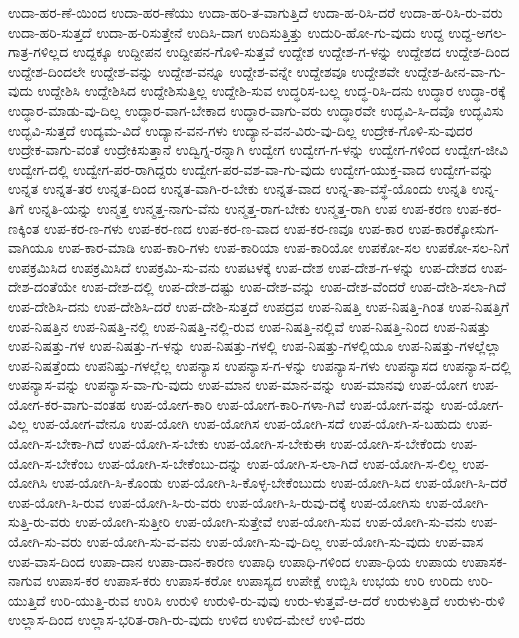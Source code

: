 {ಉದಾ-ಹರ-ಣೆ-ಯಿಂದ
ಉದಾ-ಹರ-ಣೆಯು
ಉದಾ-ಹರಿ-ತ-ವಾಗುತ್ತಿದೆ
ಉದಾ-ಹ-ರಿಸಿ-ದರೆ
ಉದಾ-ಹ-ರಿಸಿ-ರು-ವರು
ಉದಾ-ಹರಿ-ಸುತ್ತದೆ
ಉದಾ-ಹ-ರಿಸುತ್ತೇನೆ
ಉದಿಸಿ-ದಾಗ
ಉದಿಸುತ್ತಿತ್ತು
ಉದುರಿ-ಹೋ-ಗು-ವುದು
ಉದ್ದ
ಉದ್ದ-ಅಗಲ-ಗಾತ್ರ-ಗಳಿಲ್ಲದ
ಉದ್ದಕ್ಕೂ
ಉದ್ದೀಪನ
ಉದ್ದೀಪನ-ಗೊಳಿ-ಸುತ್ತವೆ
ಉದ್ದೇಶ
ಉದ್ದೇಶ-ಗ-ಳನ್ನು
ಉದ್ದೇಶದ
ಉದ್ದೇಶ-ದಿಂದ
ಉದ್ದೇಶ-ದಿಂದಲೇ
ಉದ್ದೇಶ-ವನ್ನು
ಉದ್ದೇಶ-ವನ್ನೂ
ಉದ್ದೇಶ-ವನ್ನೇ
ಉದ್ದೇಶವೂ
ಉದ್ದೇಶವೇ
ಉದ್ದೇಶ-ಹೀನ-ವಾ-ಗು-ವುದು
ಉದ್ದೇಶಿಸಿ
ಉದ್ದೇಶಿಸಿದ
ಉದ್ದೇಶಿಸುತ್ತಿಲ್ಲ
ಉದ್ದೇಶಿ-ಸುವ
ಉದ್ಧರಿಸ-ಬಲ್ಲ
ಉದ್ಧ-ರಿಸಿ-ದನು
ಉದ್ಧಾರ
ಉದ್ಧಾ-ರಕ್ಕೆ
ಉದ್ಧಾರ-ಮಾಡು-ವು-ದಿಲ್ಲ
ಉದ್ಧಾರ-ವಾಗ-ಬೇಕಾದ
ಉದ್ಧಾರ-ವಾಗು-ವರು
ಉದ್ಧಾರವೇ
ಉದ್ಭವಿ-ಸಿ-ದವೊ
ಉದ್ಭವಿಸು
ಉದ್ಭವಿ-ಸುತ್ತದೆ
ಉದ್ಯಮ-ವಿದೆ
ಉದ್ಯಾನ-ವನ-ಗಳು
ಉದ್ಯಾನ-ವನ-ವಿರು-ವು-ದಿಲ್ಲ
ಉದ್ರೇಕ-ಗೊಳಿ-ಸು-ವುದರ
ಉದ್ರೇಕ-ವಾಗು-ವಂತೆ
ಉದ್ರೇಕಿಸುತ್ತಾನೆ
ಉದ್ವಿಗ್ನ-ರನ್ನಾಗಿ
ಉದ್ವೇಗ
ಉದ್ವೇಗ-ಗ-ಳನ್ನು
ಉದ್ವೇಗ-ಗಳಿಂದ
ಉದ್ವೇಗ-ಜೀವಿ
ಉದ್ವೇಗ-ದಲ್ಲಿ
ಉದ್ವೇಗ-ಪರ-ರಾಗಿದ್ದರು
ಉದ್ವೇಗ-ಪರ-ವಶ-ವಾ-ಗು-ವುದು
ಉದ್ವೇಗ-ಯುಕ್ತ-ವಾದ
ಉದ್ವೇಗ-ವನ್ನು
ಉನ್ನತ
ಉನ್ನತ-ತರ
ಉನ್ನತ-ದಿಂದ
ಉನ್ನತ-ವಾಗಿ-ರ-ಬೇಕು
ಉನ್ನತ-ವಾದ
ಉನ್ನ-ತಾ-ವಸ್ಥೆ-ಯೊಂದು
ಉನ್ನತಿ
ಉನ್ನ-ತಿಗೆ
ಉನ್ನತಿ-ಯನ್ನು
ಉನ್ಮತ್ತ
ಉನ್ಮತ್ತ-ನಾಗು-ವೆನು
ಉನ್ಮತ್ತ-ರಾಗ-ಬೇಕು
ಉನ್ಮತ್ತ-ರಾಗಿ
ಉಪ
ಉಪ-ಕರಣ
ಉಪ-ಕರ-ಣಕ್ಕಿಂತ
ಉಪ-ಕರ-ಣ-ಗಳು
ಉಪ-ಕರ-ಣದ
ಉಪ-ಕರ-ಣ-ವಾದ
ಉಪ-ಕರ-ಣವೂ
ಉಪ-ಕಾರ
ಉಪ-ಕಾರಕ್ಕೋಸುಗ-ವಾಗಿಯೂ
ಉಪ-ಕಾರ-ಮಾಡಿ
ಉಪ-ಕಾರಿ-ಗಳು
ಉಪ-ಕಾರಿಯಾ
ಉಪ-ಕಾರಿಯೋ
ಉಪಕೋ-ಸಲ
ಉಪಕೋ-ಸಲ-ನಿಗೆ
ಉಪಕ್ರಮಿಸಿದ
ಉಪಕ್ರಮಿಸಿದೆ
ಉಪಕ್ರಮಿ-ಸು-ವನು
ಉಪಟಳಕ್ಕೆ
ಉಪ-ದೇಶ
ಉಪ-ದೇಶ-ಗ-ಳನ್ನು
ಉಪ-ದೇಶದ
ಉಪ-ದೇಶ-ದಂತೆಯೇ
ಉಪ-ದೇಶ-ದಲ್ಲಿ
ಉಪ-ದೇಶ-ದಷ್ಟು
ಉಪ-ದೇಶ-ವನ್ನು
ಉಪ-ದೇಶ-ವೆಂದರೆ
ಉಪ-ದೇಶಿ-ಸಲಾ-ಗಿದೆ
ಉಪ-ದೇಶಿಸಿ-ದನು
ಉಪ-ದೇಶಿಸಿ-ದರೆ
ಉಪ-ದೇಶಿ-ಸುತ್ತದೆ
ಉಪದ್ರವ
ಉಪ-ನಿಷತ್ತಿ
ಉಪ-ನಿಷತ್ತಿ-ಗಿಂತ
ಉಪ-ನಿಷತ್ತಿಗೆ
ಉಪ-ನಿಷತ್ತಿನ
ಉಪ-ನಿಷತ್ತಿ-ನಲ್ಲಿ
ಉಪ-ನಿಷತ್ತಿ-ನಲ್ಲಿ-ರುವ
ಉಪ-ನಿಷತ್ತಿ-ನಲ್ಲಿವೆ
ಉಪ-ನಿಷತ್ತಿ-ನಿಂದ
ಉಪ-ನಿಷತ್ತು
ಉಪ-ನಿಷತ್ತು-ಗಳ
ಉಪ-ನಿಷತ್ತು-ಗ-ಳನ್ನು
ಉಪ-ನಿಷತ್ತು-ಗಳಲ್ಲಿ
ಉಪ-ನಿಷತ್ತು-ಗಳಲ್ಲಿಯೂ
ಉಪ-ನಿಷತ್ತು-ಗಳಲ್ಲೆಲ್ಲಾ
ಉಪ-ನಿಷತ್ತೆಂದು
ಉಪನಿಷ್ತು-ಗಳಲ್ಲೆಲ್ಲ
ಉಪನ್ಯಾಸ
ಉಪನ್ಯಾಸ-ಗ-ಳನ್ನು
ಉಪನ್ಯಾಸ-ಗಳು
ಉಪನ್ಯಾಸದ
ಉಪನ್ಯಾಸ-ದಲ್ಲಿ
ಉಪನ್ಯಾಸ-ವನ್ನು
ಉಪನ್ಯಾಸ-ವಾ-ಗು-ವುದು
ಉಪ-ಮಾನ
ಉಪ-ಮಾನ-ವನ್ನು
ಉಪ-ಮಾನವು
ಉಪ-ಯೋಗ
ಉಪ-ಯೋಗ-ಕರ-ವಾಗು-ವಂತಹ
ಉಪ-ಯೋಗ-ಕಾರಿ
ಉಪ-ಯೋಗ-ಕಾರಿ-ಗಳಾ-ಗಿವೆ
ಉಪ-ಯೋಗ-ವನ್ನು
ಉಪ-ಯೋಗ-ವಿಲ್ಲ
ಉಪ-ಯೋಗ-ವೇನೂ
ಉಪ-ಯೋಗಿ
ಉಪ-ಯೋಗಿಸ
ಉಪ-ಯೋಗಿ-ಸದೆ
ಉಪ-ಯೋಗಿ-ಸ-ಬಹುದು
ಉಪ-ಯೋಗಿ-ಸ-ಬೇಕಾ-ಗಿದೆ
ಉಪ-ಯೋಗಿ-ಸ-ಬೇಕು
ಉಪ-ಯೋಗಿ-ಸ-ಬೇಕುಈ
ಉಪ-ಯೋಗಿ-ಸ-ಬೇಕೆಂದು
ಉಪ-ಯೋಗಿ-ಸ-ಬೇಕೆಂಬ
ಉಪ-ಯೋಗಿ-ಸ-ಬೇಕೆಂಬು-ದನ್ನು
ಉಪ-ಯೋಗಿ-ಸ-ಲಾ-ಗಿದೆ
ಉಪ-ಯೋಗಿ-ಸ-ಲಿಲ್ಲ
ಉಪ-ಯೋಗಿಸಿ
ಉಪ-ಯೋಗಿ-ಸಿ-ಕೊಂಡು
ಉಪ-ಯೋಗಿ-ಸಿ-ಕೊಳ್ಳ-ಬೇಕೆಂಬುದು
ಉಪ-ಯೋಗಿ-ಸಿದ
ಉಪ-ಯೋಗಿ-ಸಿ-ದರೆ
ಉಪ-ಯೋಗಿ-ಸಿ-ರುವ
ಉಪ-ಯೋಗಿ-ಸಿ-ರು-ವರು
ಉಪ-ಯೋಗಿ-ಸಿ-ರುವು-ದಕ್ಕೆ
ಉಪ-ಯೋಗಿಸು
ಉಪ-ಯೋಗಿ-ಸುತ್ತಿ-ರು-ವರು
ಉಪ-ಯೋಗಿ-ಸುತ್ತೀರಿ
ಉಪ-ಯೋಗಿ-ಸುತ್ತೇವೆ
ಉಪ-ಯೋಗಿ-ಸುವ
ಉಪ-ಯೋಗಿ-ಸು-ವನು
ಉಪ-ಯೋಗಿ-ಸು-ವರು
ಉಪ-ಯೋಗಿ-ಸು-ವ-ವನು
ಉಪ-ಯೋಗಿ-ಸು-ವು-ದಿಲ್ಲ
ಉಪ-ಯೋಗಿ-ಸು-ವುದು
ಉಪ-ವಾಸ
ಉಪ-ವಾಸ-ದಿಂದ
ಉಪಾ-ದಾನ
ಉಪಾ-ದಾನ-ಕಾರಣ
ಉಪಾಧಿ
ಉಪಾಧಿ-ಗಳಿಂದ
ಉಪಾ-ಧಿಯ
ಉಪಾಯ
ಉಪಾಸಕ-ನಾಗುವ
ಉಪಾಸ-ಕರ
ಉಪಾಸ-ಕರು
ಉಪಾಸ-ಕರೋ
ಉಪಾಸ್ಯದ
ಉಪೇಕ್ಷೆ
ಉಬ್ಬಿಸಿ
ಉಭಯ
ಉರಿ
ಉರಿದು
ಉರಿ-ಯುತ್ತಿದೆ
ಉರಿ-ಯುತ್ತಿ-ರುವ
ಉರಿಸಿ
ಉರುಳಿ
ಉರುಳಿ-ರು-ವುವು
ಉರು-ಳುತ್ತವೆ-ಆ-ದರೆ
ಉರುಳುತ್ತಿದೆ
ಉರುಳು-ರುಳಿ
ಉಲ್ಲಾಸ-ದಿಂದ
ಉಲ್ಲಾಸ-ಭರಿತ-ರಾಗಿ-ರು-ವುದು
ಉಳಿದ
ಉಳಿದ-ಮೇಲೆ
ಉಳಿ-ದರು
}
